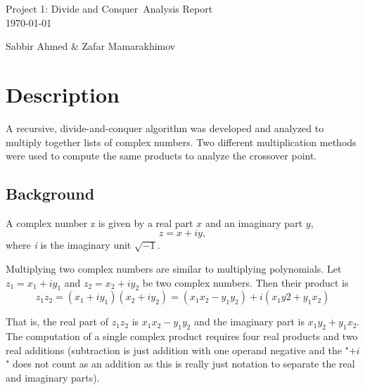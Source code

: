 \documentclass[usletter, 12pt]{article}
\newcommand{\project}{Project 1: Divide and Conquer}
\newcommand{\members}{Sabbir Ahmed \& Zafar Mamarakhimov}
\begin{document}
    \begin{titlepage}

        \vspace*{\fill} %
        \begin{center}

            {\LARGE \project~Analysis Report}\\ [1.5cm]

            \today
            
            \vspace*{\fill}

            \members

        \end{center}
        \vspace*{\fill} %

    \end{titlepage}

    \section{Description}
    A recursive, divide-and-conquer algorithm was developed and analyzed to multiply together lists of complex numbers. Two different multiplication methods were used to compute the same products to analyze the crossover point.

        \subsection{Background}
        A complex number z is given by a real part $x$ and an imaginary part $y$,
            \[ z=x+iy, \]
        where \textit{i} is the imaginary unit $\sqrt{-1}$.

        Multiplying two complex numbers are similar to multiplying polynomials. Let $z_{1}=x_{1}+iy_{1}$ and $z_{2}=x_{2}+iy_{2}$ be two complex numbers. Then their product is
            \[ z_{1}z_{2}=(x_{1}+iy_{1})(x_{2}+iy_{2})=(x_{1}x_{2}-y_{1}y_{2})+i(x_{1}y2+y_{1}x_{2}) \]

        That is, the real part of $z_{1}z_{2}$ is $x_{1}x_{2}-y_{1}y_{2}$ and the imaginary part is $x_{1}y_{2}+y_{1}x_{2}$. The computation of a single complex product requires four real products and two real additions (subtraction is just addition with one operand negative and the "$+i$" does not count as an addition as this is really just notation to separate the real and imaginary parts).
\end{document}
